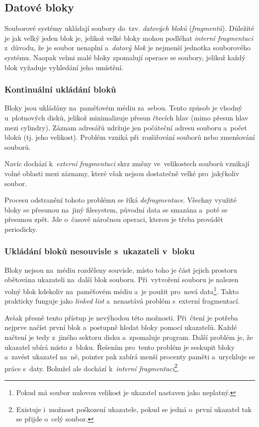 \subsection{Datové bloky}

Souborové systémy ukládají soubory do~tzv. \emph{datových bloků} (\emph{fragmentů}). Důležité je jak velký jeden blok je, jelikož velké bloky mohou podléhat \emph{interní fragmentaci} z~důvodu, že je soubor nenaplní a~\emph{datový blok} je nejmenší jednotka souborového systému. Naopak velmi malé bloky zpomalují operace se soubory, jelikož každý blok vyžaduje vyhledání jeho umístění.

\subsubsection{Kontinuální ukládání bloků}

Bloky jsou ukládány na~paměťovém médiu za~sebou. Tento způsob je vhodný u~plotnových disků, jelikož minimalizuje přesun čtecích hlav (mimo přesun hlav mezi cylindry). Záznam adresářů udržuje jen počáteční adresu souboru a~počet bloků (tj. jeho velikost). Problém vzniká při~rozšiřování souborů nebo zmenšování souborů.

Navíc dochází k~\emph{externí fragmentaci} skrz změny ve~velikostech souborů vznikají volné oblasti mezi záznamy, které však nejsou dostatečně velké pro~jakýkoliv soubor.

Procesu odstranění tohoto problému se říká \emph{defragmentace}. Všechny využité bloky se přesunou na~jiný filesystem, původní data se smazána a~poté se přesunou zpět. Jde o~časově náročnou operaci, kterou je třeba provádět periodicky.

\subsubsection{Ukládání bloků nesouvisle s~ukazateli v~bloku}

Bloky nejsou na~médiu rozděleny souvisle, místo toho je část jejich prostoru obětována ukazateli na~další blok souboru. Při~vytvoření souboru je nalezen volný blok kdekoliv na~paměťovém médiu a~je použit pro~nová data\footnote{Pokud má soubor nulovou velikost je ukazatel nastaven jako neplatný.}. Takto prakticky funguje jako \emph{linked list} a~nenastává problém s~externí fragmentací.

Avšak přesně tento přístup je nevýhodou této možnosti. Při~čtení je potřeba nejprve načíst první blok a~postupně hledat bloky pomocí ukazatelů. Každé načtení je tedy z~jiného sektoru disku a~zpomaluje program. Další problém je, že ukazatel ubírá místo z~bloku. Řešením pro~tento problém je seskupit bloky a~zavést ukazatel na~ně, pointer pak zabírá menší procenty paměti a~urychluje se práce s~daty. Bohužel ale dochází k~\emph{interní fragmentaci}\footnote{Existuje i~možnost poškození ukazatele, pokud se jedná o~první ukazatel tak se přijde o~celý soubor.}.

